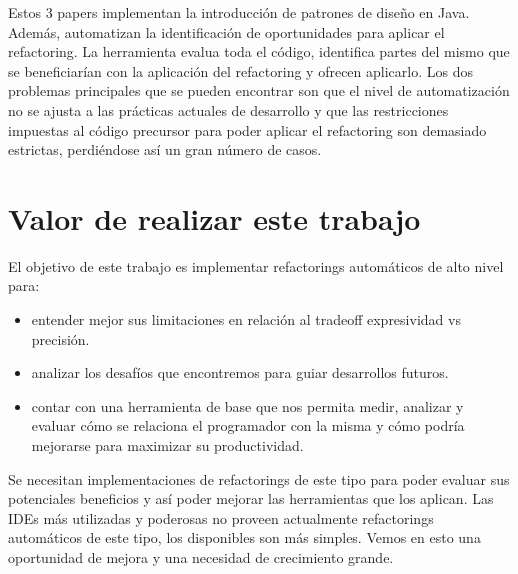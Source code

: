 \begin{description}
Estos 3 papers implementan la introducción de patrones de diseño en
Java. Además, automatizan la identificación de oportunidades para aplicar el
refactoring. La herramienta evalua toda el código, identifica partes del mismo
que se beneficiarían con la aplicación del refactoring y ofrecen aplicarlo. Los
dos problemas principales
que se pueden encontrar son que el nivel de automatización no se ajusta a las
prácticas actuales de desarrollo y que las restricciones impuestas al código
precursor para poder aplicar el refactoring son demasiado estrictas, perdiéndose
así un gran número de casos.



\section{Valor de realizar este trabajo}

El objetivo de este trabajo es implementar refactorings automáticos de alto
nivel para:

\begin{itemize}
    \item entender mejor sus limitaciones en relación al tradeoff expresividad
      vs precisión.
    \item analizar los desafíos que encontremos para guiar desarrollos futuros.
    \item contar con una herramienta de base que nos permita medir, analizar y
      evaluar cómo se relaciona el programador con la misma y cómo podría
      mejorarse para maximizar su productividad.
\end{itemize}

Se necesitan implementaciones de refactorings de este tipo para poder evaluar
sus potenciales beneficios y así poder mejorar las herramientas que los
aplican. Las IDEs más utilizadas y poderosas no proveen actualmente refactorings
automáticos de este tipo, los disponibles son más simples. Vemos en esto una
oportunidad de mejora y una necesidad de crecimiento grande.


\end{description}
